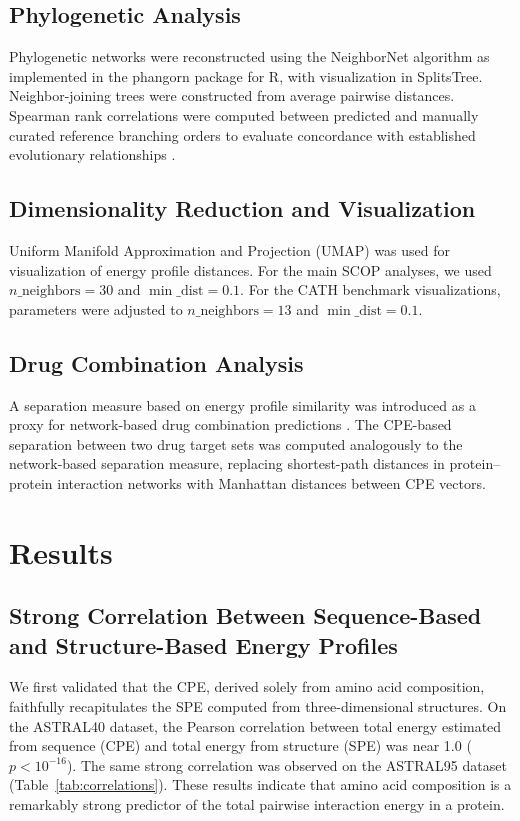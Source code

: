 \documentclass[11pt]{article}
\begin{document}
\subsection{Phylogenetic Analysis}

Phylogenetic networks were reconstructed using the NeighborNet algorithm \citep{bryant2004} as implemented in the phangorn package \citep{schliep2011} for R, with visualization in SplitsTree. Neighbor-joining trees were constructed from average pairwise distances. Spearman rank correlations were computed between predicted and manually curated reference branching orders to evaluate concordance with established evolutionary relationships \citep{malik2020,lelievre2016}.

\subsection{Dimensionality Reduction and Visualization}

Uniform Manifold Approximation and Projection (UMAP) \citep{mcinnes2018} was used for visualization of energy profile distances. For the main SCOP analyses, we used $n\_\text{neighbors} = 30$ and $\min\_\text{dist} = 0.1$. For the CATH benchmark visualizations, parameters were adjusted to $n\_\text{neighbors} = 13$ and $\min\_\text{dist} = 0.1$.

\subsection{Drug Combination Analysis}

A separation measure based on energy profile similarity was introduced as a proxy for network-based drug combination predictions \citep{cheng2019}. The CPE-based separation between two drug target sets was computed analogously to the network-based separation measure, replacing shortest-path distances in protein--protein interaction networks with Manhattan distances between CPE vectors.

\section{Results}

\subsection{Strong Correlation Between Sequence-Based and Structure-Based Energy Profiles}

We first validated that the CPE, derived solely from amino acid composition, faithfully recapitulates the SPE computed from three-dimensional structures. On the ASTRAL40 dataset, the Pearson correlation between total energy estimated from sequence (CPE) and total energy from structure (SPE) was near 1.0 ($p < 10^{-16}$). The same strong correlation was observed on the ASTRAL95 dataset (Table~\ref{tab:correlations}). These results indicate that amino acid composition is a remarkably strong predictor of the total pairwise interaction energy in a protein.
\end{document}
